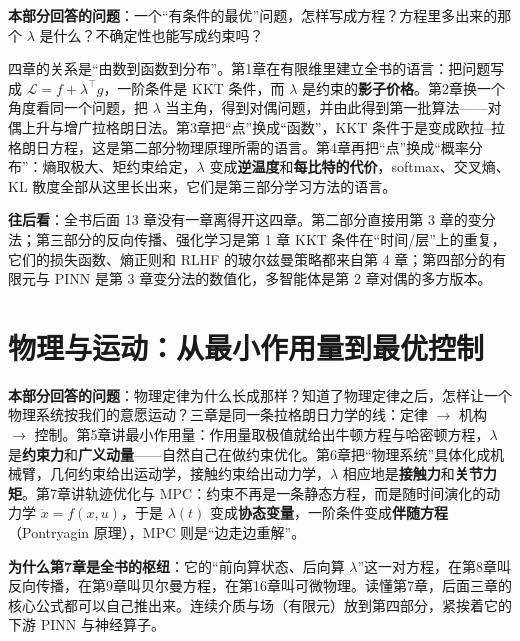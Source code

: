 \documentclass[11pt,a4paper,twoside,openright]{book}
\theoremstyle{definition}
\newenvironment{partintro}
{\begin{tcolorbox}[colback=gray!5, colframe=gray!50, boxrule=0.6pt, arc=2mm, left=8pt, right=8pt, top=6pt, bottom=6pt, title=本部分导读, fonttitle=\bfseries]}
{\end{tcolorbox}}
\newcommand{\Lag}{\mathcal{L}}
\begin{document}
\begin{partintro}
\textbf{本部分回答的问题}：一个“有条件的最优”问题，怎样写成方程？方程里多出来的那个 $\lambda$ 是什么？不确定性也能写成约束吗？

四章的关系是“由数到函数到分布”。第1章在有限维里建立全书的语言：把问题写成 $\Lag = f + \lambda^\top g$，一阶条件是 KKT 条件，而 $\lambda$ 是约束的\textbf{影子价格}。第2章换一个角度看同一个问题，把 $\lambda$ 当主角，得到对偶问题，并由此得到第一批算法——对偶上升与增广拉格朗日法。第3章把“点”换成“函数”，KKT 条件于是变成欧拉--拉格朗日方程，这是第二部分物理原理所需的语言。第4章再把“点”换成“概率分布”：熵取极大、矩约束给定，$\lambda$ 变成\textbf{逆温度}和\textbf{每比特的代价}，softmax、交叉熵、KL 散度全部从这里长出来，它们是第三部分学习方法的语言。

\textbf{往后看}：全书后面 13 章没有一章离得开这四章。第二部分直接用第 3 章的变分法；第三部分的反向传播、强化学习是第 1 章 KKT 条件在“时间/层”上的重复，它们的损失函数、熵正则和 RLHF 的玻尔兹曼策略都来自第 4 章；第四部分的有限元与 PINN 是第 3 章变分法的数值化，多智能体是第 2 章对偶的多方版本。
\end{partintro}



\part{物理与运动：从最小作用量到最优控制}

\begin{partintro}
\textbf{本部分回答的问题}：物理定律为什么长成那样？知道了物理定律之后，怎样让一个物理系统按我们的意愿运动？三章是同一条拉格朗日力学的线：定律 $\to$ 机构 $\to$ 控制。第5章讲最小作用量：作用量取极值就给出牛顿方程与哈密顿方程，$\lambda$ 是\textbf{约束力}和\textbf{广义动量}——自然自己在做约束优化。第6章把“物理系统”具体化成机械臂，几何约束给出运动学，接触约束给出动力学，$\lambda$ 相应地是\textbf{接触力}和\textbf{关节力矩}。第7章讲轨迹优化与 MPC：约束不再是一条静态方程，而是随时间演化的动力学 $\dot x = f(x,u)$，于是 $\lambda(t)$ 变成\textbf{协态变量}，一阶条件变成\textbf{伴随方程}（Pontryagin 原理），MPC 则是“边走边重解”。

\textbf{为什么第7章是全书的枢纽}：它的“前向算状态、后向算 $\lambda$”这一对方程，在第8章叫反向传播，在第9章叫贝尔曼方程，在第16章叫可微物理。读懂第7章，后面三章的核心公式都可以自己推出来。连续介质与场（有限元）放到第四部分，紧挨着它的下游 PINN 与神经算子。
\end{partintro}
\end{document}
